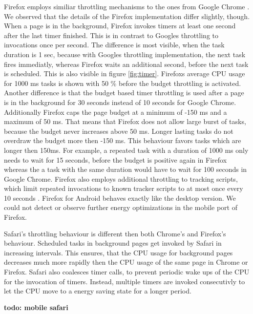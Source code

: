 \documentclass[
	ruledheaders=section,%
	class=report,%
	thesis={type=bachelor},%
	accentcolor=9c,%
	custommargins=true,%
	marginpar=false,%
	parskip=half-,%
	fontsize=11pt,%
]{tudapub}
\begin{document}
  Firefox employs similiar throttling mechanisms to the ones from Google Chrome \cite{mdn-page-visibility}. We observed that the details of the Firefox implementation differ slightly, though. When a page is in the background, Firefox invokes timers at least one second after the last timer finished. This is in contrast to Googles throttling to invocations once per second. The difference is most visible, when the task duration is 1 sec, because with Googles throttling implementation, the next task fires immediatly, whereas Firefox waits an additional second, before the next task is scheduled. This is also visible in figure \ref{fig:timer}. Firefoxs average CPU usage for 1000 ms tasks is shown with 50 \% before the budget throttling is activated. Another difference is that the budget based timer throttling is used after a page is in the background for 30 seconds instead of 10 seconds for Google Chrome. Additionally Firefox caps the page budget at a minimum of -150 ms and a maximum of 50 ms. That means that Firefox does not allow large burst of tasks, because the budget never increases above 50 ms. Longer lasting tasks do not overdraw the budget more then -150 ms. This behaviour favors tasks which are longer then 150ms. For example, a repeated task with a duration of 1000 ms only needs to wait for 15 seconds, before the budget is positive again in Firefox whereas the a task with the same duration would have to wait for 100 seconds in Google Chrome. Firefox also employs additional throttling to tracking scripts, which limit repeated invocations to known tracker scripts to at most once every 10 seconds \cite{mdn-tracker-throttling}. Firefox for Android behaves exactly like the desktop version. We could not detect or observe further energy optimizations in the mobile port of Firefox. 

  Safari's throttling behaviour is different then both Chrome's and Firefox's behaviour. Scheduled tasks in background pages get invoked by Safari in increasing intervals. This ensures, that the CPU usage for background pages decreases much more rapidly then the CPU usage of the same page in Chrome or Firefox. Safari also coalesces timer calls, to prevent periodic wake ups of the CPU for the invocation of timers. Instead, multiple timers are invoked consecutivly to let the CPU move to a energy saving state for a longer period.

  \textbf{todo: mobile safari}
  
\end{document}
